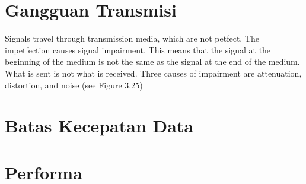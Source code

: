 \section{Gangguan Transmisi}
Signals travel through transmission media, which are not petfect. The impetfection causes signal impairment. This means that the signal at the beginning of the medium is not the same as the signal at the end of the medium. What is sent is not what is received. Three causes of impairment are attenuation, distortion, and noise (see Figure 3.25)

\section{Batas Kecepatan Data}

\section{Performa}

